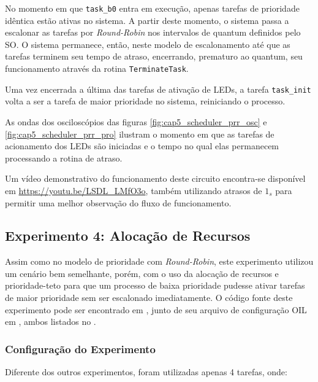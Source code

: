 No momento em que \texttt{task\_b0} entra em execução, apenas tarefas de prioridade idêntica estão ativas no sistema. A partir deste momento, o sistema passa a escalonar as tarefas por \emph{Round-Robin} nos intervalos de quantum definidos pelo SO. O sistema permanece, então, neste modelo de escalonamento até que as tarefas terminem seu tempo de atraso, encerrando, prematuro ao quantum, seu funcionamento através da rotina \texttt{TerminateTask}.

Uma vez encerrada a última das tarefas de ativação de LEDs, a tarefa \texttt{task\_init} volta a ser a tarefa de maior prioridade no sistema, reiniciando o processo.

As ondas dos osciloscópios das figuras \ref{fig:cap5_scheduler_prr_osc} e \ref{fig:cap5_scheduler_prr_pro} ilustram o momento em que as tarefas de acionamento dos LEDs são iniciadas e o tempo no qual elas permanecem processando a rotina de atraso.



Um vídeo demonstrativo do funcionamento deste circuito encontra-se disponível em \url{https://youtu.be/LSDL_LMfO3o}, também utilizando atrasos de $1_s$ para permitir uma melhor observação do fluxo de funcionamento.

\subsection{Experimento 4: Alocação de Recursos}

Assim como no modelo de prioridade com \emph{Round-Robin}, este experimento utilizou um cenário bem semelhante, porém, com o uso da alocação de recursos e prioridade-teto para que um processo de baixa prioridade pudesse ativar tarefas de maior prioridade sem ser escalonado imediatamente. O código fonte deste experimento pode ser encontrado em , junto de seu arquivo de configuração OIL em , ambos listados no .

\subsubsection{Configuração do Experimento}

Diferente dos outros experimentos, foram utilizadas apenas 4 tarefas, onde:

